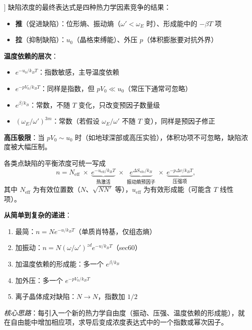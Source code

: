 \begin{insightbox}]
缺陷浓度的最终表达式是四种热力学因素竞争的结果：
\begin{itemize}
    \item \textbf{推}（促进缺陷）：位形熵、振动熵（$\omega'\!<\!\omega_E$ 时）、形成能中的 $-\beta T$ 项
    \item \textbf{拉}（抑制缺陷）：$u_0$（晶格束缚能）、外压 $p$（体积膨胀要对抗外界）
\end{itemize}

\textbf{温度依赖的层次}：
\begin{itemize}
    \item $e^{-u_0/k_{\!B}T}$：指数敏感，主导温度依赖
    \item $e^{-pV_0/k_{\!B}T}$：同样是指数，但 $pV_0\ll u_0$（常压下通常可忽略）
    \item $e^{\beta/k_{\!B}}$：常数，不随 $T$ 变化，只改变预因子数量级
    \item $(\omega_E/\omega')^{3m}$：常数（若假设 $\omega_E/\omega'$ 不随 $T$ 变），同样是预因子修正
\end{itemize}

\textbf{高压极限}：当 $pV_0\sim u_0$ 时（如地球深部或高压实验），体积功项不可忽略，缺陷浓度被大幅压制。
\end{insightbox}

\begin{thinkbox}
各类点缺陷的平衡浓度可统一写成
\begin{equation}
n = N_{\mathrm{eff}}\;\times\;\underbrace{e^{-u_{\mathrm{eff}}/k_{\!B}T}}_{\text{热激活}}
\;\times\;\underbrace{e^{\Delta S_{\mathrm{vib}}/k_{\!B}}}_{\text{振动熵预因子}}
\;\times\;\underbrace{e^{-p\Delta v/k_{\!B}T}}_{\text{压强项}},
\end{equation}
其中 $N_{\mathrm{eff}}$ 为有效位置数（$N$、$\sqrt{NN'}$ 等），$u_{\mathrm{eff}}$ 为有效形成能（可能含 $T$ 线性项）。

\textbf{从简单到复杂的递进}：
\begin{enumerate}
    \item 最简：$n = N e^{-u/k_{\!B}T}$（单质肖特基，仅组态熵）
    \item 加振动：$n = N(\omega/\omega')^{zd} e^{-u/k_{\!B}T}$（sec60）
    \item 加温度依赖的形成能：多一个 $e^{\beta/k_{\!B}}$
    \item 加外压：多一个 $e^{-pV_0/k_{\!B}T}$
    \item 离子晶体成对缺陷：$N\to N$，指数加 $1/2$
\end{enumerate}
\textit{核心思路}：每引入一个新的热力学自由度（振动、压强、温度依赖的形成能），就在自由能中增加相应项，求导后变成浓度表达式中的一个指数或幂次因子。
\end{thinkbox}
